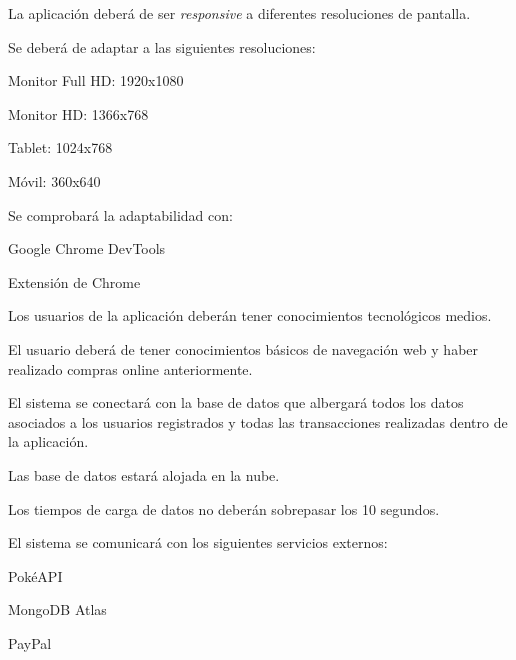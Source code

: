 \begin{RNF}
	\item La aplicación deberá de ser \textit{responsive} a diferentes resoluciones de pantalla.
	\begin{RNF}
		\item Se deberá de adaptar a las siguientes resoluciones:
		\begin{RNF}
			\item Monitor Full HD: 1920x1080
			\item Monitor HD: 1366x768
			\item Tablet: 1024x768
			\item Móvil: 360x640
		\end{RNF}
		\item Se comprobará la adaptabilidad con:
		\begin{RNF}
			\item Google Chrome DevTools
			\item Extensión de Chrome 
		\end{RNF}
	\end{RNF}
	

	\item Los usuarios de la aplicación deberán tener conocimientos tecnológicos medios.
	\begin{RNF}
		\item El usuario deberá de tener conocimientos básicos de navegación web y haber realizado compras online anteriormente.
	\end{RNF}
	
	\item El sistema se conectará con la base de datos que albergará todos los datos asociados a los usuarios registrados y todas las transacciones realizadas dentro de la aplicación.
	\begin{RNF}
		\item Las base de datos estará alojada en la nube.
		\item Los tiempos de carga de datos no deberán sobrepasar los 10 segundos.
	\end{RNF}

	\item El sistema se comunicará con los siguientes servicios externos:
	\begin{RNF}
		\item PokéAPI
		\item MongoDB Atlas
		\item PayPal
	\end{RNF}
\end{RNF}